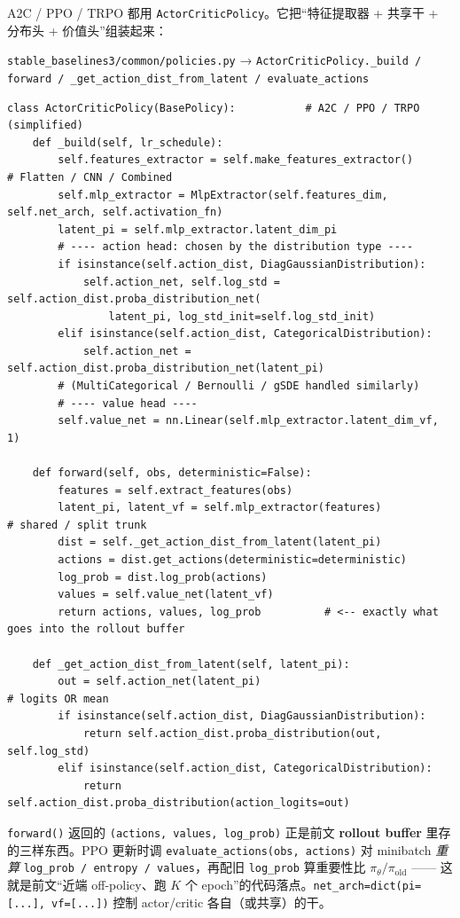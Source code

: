 \documentclass[11pt,a4paper]{article}
\begin{document}
A2C / PPO / TRPO 都用 \texttt{ActorCriticPolicy}。它把“特征提取器 + 共享干 + 分布头 + 价值头”组装起来：

\begin{srcbox}
\texttt{stable\_baselines3/common/policies.py} → \texttt{ActorCriticPolicy.\_build / forward / \_get\_action\_dist\_from\_latent / evaluate\_actions}
\end{srcbox}

\begin{lstlisting}
class ActorCriticPolicy(BasePolicy):           # A2C / PPO / TRPO  (simplified)
    def _build(self, lr_schedule):
        self.features_extractor = self.make_features_extractor()       # Flatten / CNN / Combined
        self.mlp_extractor = MlpExtractor(self.features_dim, self.net_arch, self.activation_fn)
        latent_pi = self.mlp_extractor.latent_dim_pi
        # ---- action head: chosen by the distribution type ----
        if isinstance(self.action_dist, DiagGaussianDistribution):
            self.action_net, self.log_std = self.action_dist.proba_distribution_net(
                latent_pi, log_std_init=self.log_std_init)
        elif isinstance(self.action_dist, CategoricalDistribution):
            self.action_net = self.action_dist.proba_distribution_net(latent_pi)
        # (MultiCategorical / Bernoulli / gSDE handled similarly)
        # ---- value head ----
        self.value_net = nn.Linear(self.mlp_extractor.latent_dim_vf, 1)

    def forward(self, obs, deterministic=False):
        features = self.extract_features(obs)
        latent_pi, latent_vf = self.mlp_extractor(features)            # shared / split trunk
        dist = self._get_action_dist_from_latent(latent_pi)
        actions = dist.get_actions(deterministic=deterministic)
        log_prob = dist.log_prob(actions)
        values = self.value_net(latent_vf)
        return actions, values, log_prob          # <-- exactly what goes into the rollout buffer

    def _get_action_dist_from_latent(self, latent_pi):
        out = self.action_net(latent_pi)                               # logits OR mean
        if isinstance(self.action_dist, DiagGaussianDistribution):
            return self.action_dist.proba_distribution(out, self.log_std)
        elif isinstance(self.action_dist, CategoricalDistribution):
            return self.action_dist.proba_distribution(action_logits=out)
\end{lstlisting}

\begin{tiebox}
\texttt{forward()} 返回的 \texttt{(actions, values, log\_prob)} 正是前文 \textbf{rollout buffer} 里存的三样东西。PPO 更新时调 \texttt{evaluate\_actions(obs, actions)} 对 minibatch \emph{重算} \texttt{log\_prob / entropy / values}，再配旧 \texttt{log\_prob} 算重要性比 $\pi_\theta/\pi_{\text{old}}$ —— 这就是前文“近端 off-policy、跑 $K$ 个 epoch”的代码落点。\texttt{net\_arch=dict(pi=[...], vf=[...])} 控制 actor/critic 各自（或共享）的干。
\end{tiebox}
\end{document}
